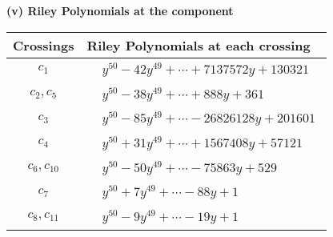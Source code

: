 \documentclass[1p]{elsarticle_modified}
\theoremstyle{definition}
\begin{document}
\newpage\renewcommand{\arraystretch}{1}
\flushleft \textbf{(v) Riley Polynomials at the component}\newline \\
\begin{tabular}{m{50pt}|m{274pt}}
Crossings & \hspace{64pt}Riley Polynomials at each crossing \\
\hline $$\begin{aligned}c_{1}\end{aligned}$$&$\begin{aligned}
&y^{50}-42 y^{49}+\cdots+7137572 y+130321
\end{aligned}$\\
\hline $$\begin{aligned}c_{2},c_{5}\end{aligned}$$&$\begin{aligned}
&y^{50}-38 y^{49}+\cdots+888 y+361
\end{aligned}$\\
\hline $$\begin{aligned}c_{3}\end{aligned}$$&$\begin{aligned}
&y^{50}-85 y^{49}+\cdots-26826128 y+201601
\end{aligned}$\\
\hline $$\begin{aligned}c_{4}\end{aligned}$$&$\begin{aligned}
&y^{50}+31 y^{49}+\cdots+1567408 y+57121
\end{aligned}$\\
\hline $$\begin{aligned}c_{6},c_{10}\end{aligned}$$&$\begin{aligned}
&y^{50}-50 y^{49}+\cdots-75863 y+529
\end{aligned}$\\
\hline $$\begin{aligned}c_{7}\end{aligned}$$&$\begin{aligned}
&y^{50}+7 y^{49}+\cdots-88 y+1
\end{aligned}$\\
\hline $$\begin{aligned}c_{8},c_{11}\end{aligned}$$&$\begin{aligned}
&y^{50}-9 y^{49}+\cdots-19 y+1
\end{aligned}$\\

\end{tabular}
\end{document}
